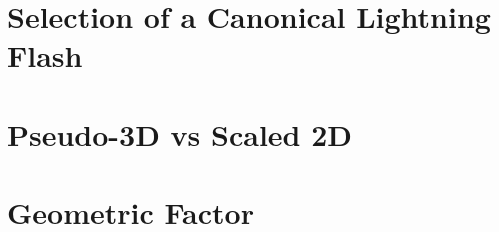 
\section{Selection of a Canonical Lightning Flash}

\section{Pseudo-3D vs Scaled 2D}
\label{section:longitude_scaling}

\section{Geometric Factor}
